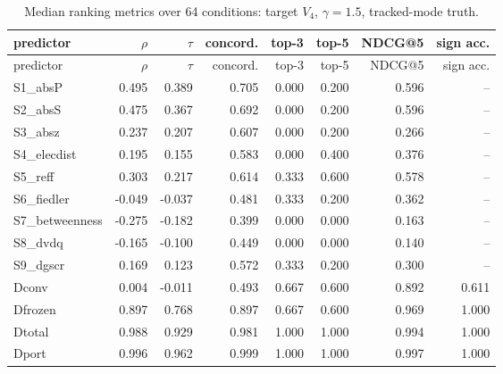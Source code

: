 \documentclass[10pt,a4paper]{article}
\begin{document}
{\scriptsize
\begin{longtable}{lrrrrrrr}
\caption{Median ranking metrics over 64 conditions: target $V_4$, $\gamma=1.5$, tracked-mode truth.}\label{tab:s-bl-H4-1.5-SAME}\\
\toprule
predictor & $\rho$ & $\tau$ & concord. & top-3 & top-5 & NDCG@5 & sign acc. \\
\midrule
\endfirsthead
\toprule
predictor & $\rho$ & $\tau$ & concord. & top-3 & top-5 & NDCG@5 & sign acc. \\
\midrule
\endhead
S1\_absP & 0.495 & 0.389 & 0.705 & 0.000 & 0.200 & 0.596 & -- \\
S2\_absS & 0.475 & 0.367 & 0.692 & 0.000 & 0.200 & 0.596 & -- \\
S3\_absz & 0.237 & 0.207 & 0.607 & 0.000 & 0.200 & 0.266 & -- \\
S4\_elecdist & 0.195 & 0.155 & 0.583 & 0.000 & 0.400 & 0.376 & -- \\
S5\_reff & 0.303 & 0.217 & 0.614 & 0.333 & 0.600 & 0.578 & -- \\
S6\_fiedler & -0.049 & -0.037 & 0.481 & 0.333 & 0.200 & 0.362 & -- \\
S7\_betweenness & -0.275 & -0.182 & 0.399 & 0.000 & 0.000 & 0.163 & -- \\
S8\_dvdq & -0.165 & -0.100 & 0.449 & 0.000 & 0.000 & 0.140 & -- \\
S9\_dgscr & 0.169 & 0.123 & 0.572 & 0.333 & 0.200 & 0.300 & -- \\
Dconv & 0.004 & -0.011 & 0.493 & 0.667 & 0.600 & 0.892 & 0.611 \\
Dfrozen & 0.897 & 0.768 & 0.897 & 0.667 & 0.600 & 0.969 & 1.000 \\
Dtotal & 0.988 & 0.929 & 0.981 & 1.000 & 1.000 & 0.994 & 1.000 \\
Dport & 0.996 & 0.962 & 0.999 & 1.000 & 1.000 & 0.997 & 1.000 \\
\bottomrule
\end{longtable}}
\end{document}
